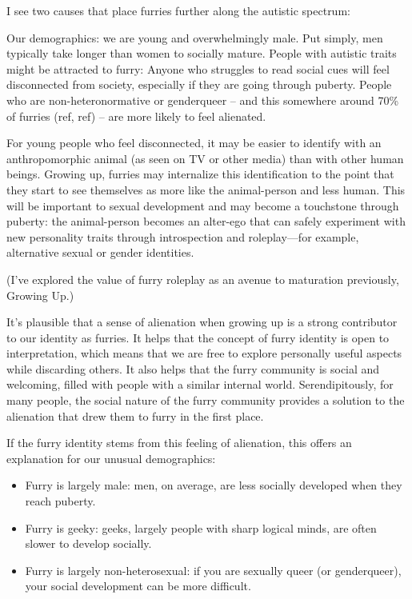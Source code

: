 I see two causes that place furries further along the autistic spectrum:

Our demographics: we are young and overwhelmingly male. Put simply, men typically take longer than women to socially mature.
People with autistic traits might be attracted to furry:
Anyone who struggles to read social cues will feel disconnected from society, especially if they are going through puberty. People who are non-heteronormative or genderqueer -- and this somewhere around 70\% of furries (ref, ref) -- are more likely to feel alienated.

For young people who feel disconnected, it may be easier to identify with an anthropomorphic animal (as seen on TV or other media) than with other human beings. Growing up, furries may internalize this identification to the point that they start to see themselves as more like the animal-person and less human. This will be important to sexual development and may become a touchstone through puberty: the animal-person becomes an alter-ego that can safely experiment with new personality traits through introspection and roleplay—for example, alternative sexual or gender identities.

(I've explored the value of furry roleplay as an avenue to maturation previously, Growing Up.)

It's plausible that a sense of alienation when growing up is a strong contributor to our identity as furries. It helps that the concept of furry identity is open to interpretation, which means that we are free to explore personally useful aspects while discarding others. It also helps that the furry community is social and welcoming, filled with people with a similar internal world. Serendipitously, for many people, the social nature of the furry community provides a solution to the alienation that drew them to furry in the first place.

If the furry identity stems from this feeling of alienation, this offers an explanation for our unusual demographics:

\begin{itemize}
  \item Furry is largely male: men, on average, are less socially developed when they reach puberty.
  \item Furry is geeky: geeks, largely people with sharp logical minds, are often slower to develop socially.
  \item Furry is largely non-heterosexual: if you are sexually queer (or genderqueer), your social development can be more difficult.
\end{itemize}

